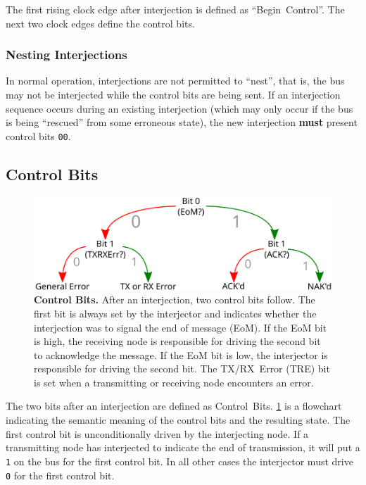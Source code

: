 The first rising clock edge after interjection is defined as ``Begin~Control''.
The next two clock edges define the control bits.

\subsubsection{Nesting Interjections}
In normal operation, interjections are not permitted to ``nest'', that is, the
bus may not be interjected while the control bits are being sent. If an
interjection sequence occurs during an existing interjection (which may only
occur if the bus is being ``rescued'' from some erroneous state), the new
interjection {\bf must} present control bits {\tt 00}.

\subsection{Control Bits}
\label{sec:bus-control}

\begin{figure}
  \includegraphics[width=\linewidth]{img/control_bits}
  \caption{\textbf{Control Bits.} \textmd{
      After an interjection, two control bits follow. The first bit is always
      set by the interjector and indicates whether the interjection was to
      signal the end of message (EoM). If the EoM bit is high, the receiving
      node is responsible for driving the second bit to acknowledge the
      message.  If the EoM bit is low, the interjector is responsible for
      driving the second bit. The TX/RX~Error (TRE) bit is set when a
      transmitting or receiving node encounters an error.
  }}
  \label{fig:control-bits}
\end{figure}

The two bits after an interjection are defined as Control~Bits.
\cref{fig:control-bits} is a flowchart indicating the semantic meaning
of the control bits and the resulting state. The first control bit is
unconditionally driven by the interjecting node. If a transmitting node has
interjected to indicate the end of transmission, it will put a {\tt 1} on the
bus for the first control bit. In all other cases the interjector must drive
{\tt 0} for the first control bit.

